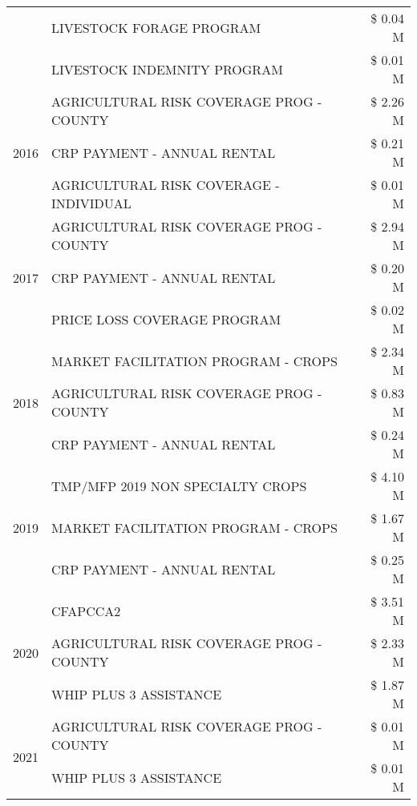 \begin{tabular}{llr}
 & LIVESTOCK FORAGE PROGRAM & \$ 0.04 M \\
 & LIVESTOCK INDEMNITY PROGRAM & \$ 0.01 M \\
\cline{1-3}
\multirow[t]{3}{*}{2016} & AGRICULTURAL RISK COVERAGE PROG - COUNTY      & \$ 2.26 M \\
 & CRP PAYMENT - ANNUAL RENTAL                   & \$ 0.21 M \\
 & AGRICULTURAL RISK COVERAGE - INDIVIDUAL       & \$ 0.01 M \\
\cline{1-3}
\multirow[t]{3}{*}{2017} & AGRICULTURAL RISK COVERAGE PROG - COUNTY & \$ 2.94 M \\
 & CRP PAYMENT - ANNUAL RENTAL & \$ 0.20 M \\
 & PRICE LOSS COVERAGE PROGRAM & \$ 0.02 M \\
\cline{1-3}
\multirow[t]{3}{*}{2018} & MARKET FACILITATION PROGRAM - CROPS & \$ 2.34 M \\
 & AGRICULTURAL RISK COVERAGE PROG - COUNTY & \$ 0.83 M \\
 & CRP PAYMENT - ANNUAL RENTAL & \$ 0.24 M \\
\cline{1-3}
\multirow[t]{3}{*}{2019} & TMP/MFP 2019 NON SPECIALTY CROPS & \$ 4.10 M \\
 & MARKET FACILITATION PROGRAM - CROPS & \$ 1.67 M \\
 & CRP PAYMENT - ANNUAL RENTAL & \$ 0.25 M \\
\cline{1-3}
\multirow[t]{3}{*}{2020} & CFAPCCA2 & \$ 3.51 M \\
 & AGRICULTURAL RISK COVERAGE PROG - COUNTY & \$ 2.33 M \\
 & WHIP PLUS 3 ASSISTANCE & \$ 1.87 M \\
\cline{1-3}
\multirow[t]{2}{*}{2021} & AGRICULTURAL RISK COVERAGE PROG - COUNTY & \$ 0.01 M \\
 & WHIP PLUS 3 ASSISTANCE & \$ 0.01 M \\
\cline{1-3}
\bottomrule
\end{tabular}

